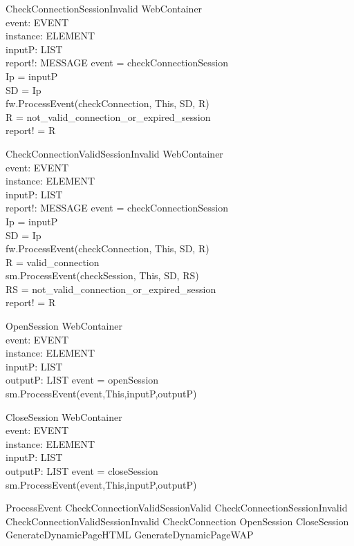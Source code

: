 \begin{schema}{CheckConnectionSessionInvalid}
\Delta WebContainer \\
event: EVENT \\
instance: ELEMENT \\
inputP: LIST \\
report!: MESSAGE 
\where event = checkConnectionSession \\
Ip = \head inputP \\
SD = \lseq Ip \rseq \\
fw.ProcessEvent(checkConnection, This, SD, R) \\
R = not\_valid\_connection\_or\_expired\_session \\
report! = R
\end{schema}

\begin{schema}{CheckConnectionValidSessionInvalid}
\Delta WebContainer \\
event: EVENT \\
instance: ELEMENT \\
inputP: LIST \\
report!: MESSAGE 
\where event = checkConnectionSession \\
Ip = \head inputP \\
SD = \lseq Ip \rseq \\
fw.ProcessEvent(checkConnection, This, SD, R) \\
R = valid\_connection \\
sm.ProcessEvent(checkSession, This, SD, RS) \\
RS = not\_valid\_connection\_or\_expired\_session \\
report! = R
\end{schema}

\begin{schema}{OpenSession}
\Delta WebContainer \\
event: EVENT \\
instance: ELEMENT \\
inputP: LIST \\
outputP: LIST 
\where event = openSession \\
sm.ProcessEvent(event,This,inputP,outputP)
\end{schema}

\begin{schema}{CloseSession}
\Delta WebContainer \\
event: EVENT \\
instance: ELEMENT \\
inputP: LIST \\
outputP: LIST 
\where event = closeSession \\
sm.ProcessEvent(event,This,inputP,outputP)
\end{schema}

\begin{zed} ProcessEvent \sdef  
CheckConnectionValidSessionValid
\lor CheckConnectionSessionInvalid
\lor CheckConnectionValidSessionInvalid
\lor CheckConnection
\lor OpenSession
\lor CloseSession
\lor GenerateDynamicPageHTML
\lor GenerateDynamicPageWAP
\end{zed}




